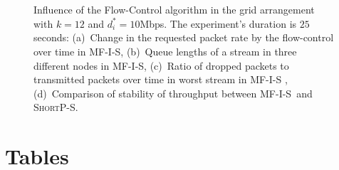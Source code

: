 \documentclass[11pt]{article}
\newenvironment{proof sketch}[1]{\noindent {\emph{Proof sketch of #1:}}}{\hfill \qed}
\newcommand{\algA}{\textsc{MF-I-S}}
\newcommand{\algBS}{\textsc{ShortP-S}}
\begin{document}
\begin{figure}%
  \centering {}
  \\
  \\
  \caption{Influence of the Flow-Control algorithm in the grid
    arrangement with $k=12$ and $d^*_i=10$Mbps. The experiment's
    duration is $25$ seconds: (a)~Change in the requested packet rate
    by the flow-control over time in \algA , (b)~Queue lengths of a
    stream in three different nodes in \algA , (c)~Ratio of dropped
    packets to transmitted packets over time in worst stream in \algA
    , (d)~Comparison of stability of throughput between \algA\ and
    \algBS.  }
  \label{fig:fcbig}
\end{figure}

\section{Tables}~\label{sec:tables} 
\end{document}
